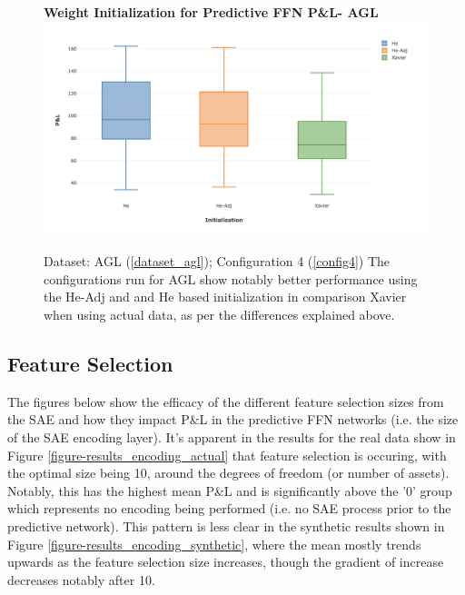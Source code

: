 \documentclass[a4paper,11pt,oneside]{article}
\theoremstyle{plain}
\theoremstyle{definition}
\begin{document}
\begin{figure}[H]
	\centering 
	\textbf{Weight Initialization for Predictive FFN P\&L- AGL} 
		\includegraphics[scale=0.35]{images/results/init/AGL_pl.png}
	\caption{Dataset: AGL (\ref{dataset_agl}); Configuration 4 (\ref{config4})
		\newline The configurations run for AGL show notably better performance using the He-Adj and and He based initialization in comparison Xavier when using actual data, as per the differences explained above.}
	\label{figure-init5_ffn_init}
\end{figure}


\newpage
\subsection{Feature Selection}

The figures below show the efficacy of the different feature selection sizes from the SAE and how they impact P\&L in the predictive FFN networks (i.e. the size of the SAE encoding layer). It's apparent in the results for the real data show in Figure \ref{figure-results_encoding_actual} that feature selection is occuring, with the optimal size being 10, around the degrees of freedom (or number of assets). Notably, this has the highest mean P\&L and is significantly above the '0' group which represents no encoding being performed (i.e. no SAE process prior to the predictive network). This pattern is less clear in the synthetic results shown in Figure \ref{figure-results_encoding_synthetic}, where the mean mostly trends upwards as the feature selection size increases, though the gradient of increase decreases notably after 10.\newline

\end{document}
